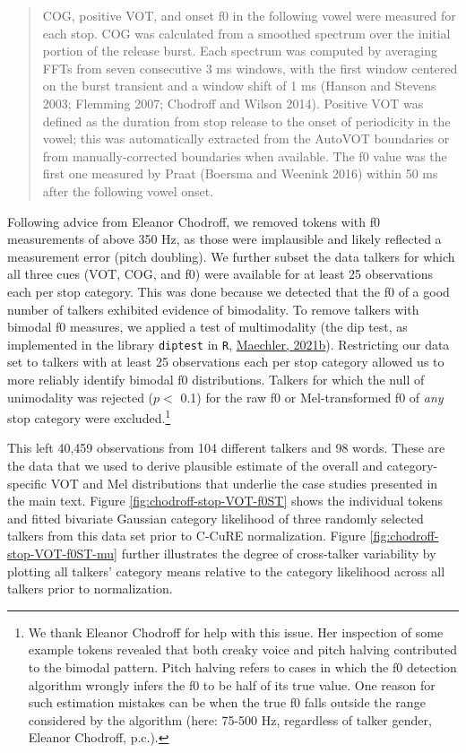 \documentclass[
  11pt,
  english,
  man,floatsintext]{apa6}
\begin{document}
\begin{quote}
COG, positive VOT, and onset f0 in the following vowel were measured for each stop. COG was calculated
from a smoothed spectrum over the initial portion of the release burst. Each spectrum was computed by averaging
FFTs from seven consecutive 3 ms windows, with the first window centered on the burst transient and
a window shift of 1 ms (Hanson and Stevens 2003; Flemming 2007; Chodroff and Wilson 2014). Positive VOT
was defined as the duration from stop release to the onset of periodicity in the vowel; this was automatically
extracted from the AutoVOT boundaries or from manually-corrected boundaries when available. The
f0 value was the first one measured by Praat (Boersma and Weenink 2016) within 50 ms after the following
vowel onset.
\end{quote}

Following advice from Eleanor Chodroff, we removed tokens with f0 measurements of above 350 Hz, as those were implausible and likely reflected a measurement error (pitch doubling). We further subset the data talkers for which all three cues (VOT, COG, and f0) were available for at least 25 observations each per stop category. This was done because we detected that the f0 of a good number of talkers exhibited evidence of bimodality. To remove talkers with bimodal f0 measures, we applied a test of multimodality (the dip test, as implemented in the library \texttt{diptest} in \texttt{R}, \protect\hyperlink{ref-maechler2021}{Maechler, 2021b}). Restricting our data set to talkers with at least 25 observations each per stop category allowed us to more reliably identify bimodal f0 distributions. Talkers for which the null of unimodality was rejected (\(p<\) 0.1) for the raw f0 or Mel-transformed f0 of \emph{any} stop category were excluded.\footnote{We thank Eleanor Chodroff for help with this issue. Her inspection of some example tokens revealed that both creaky voice and pitch halving contributed to the bimodal pattern. Pitch halving refers to cases in which the f0 detection algorithm wrongly infers the f0 to be half of its true value. One reason for such estimation mistakes can be when the true f0 falls outside the range considered by the algorithm (here: 75-500 Hz, regardless of talker gender, Eleanor Chodroff, p.c.).}

This left 40,459 observations from 104 different talkers and 98 words. These are the data that we used to derive plausible estimate of the overall and category-specific VOT and Mel distributions that underlie the case studies presented in the main text. Figure \ref{fig:chodroff-stop-VOT-f0ST} shows the individual tokens and fitted bivariate Gaussian category likelihood of three randomly selected talkers from this data set prior to C-CuRE normalization. Figure \ref{fig:chodroff-stop-VOT-f0ST-mu} further illustrates the degree of cross-talker variability by plotting all talkers' category means relative to the category likelihood across all talkers prior to normalization.
\end{document}

